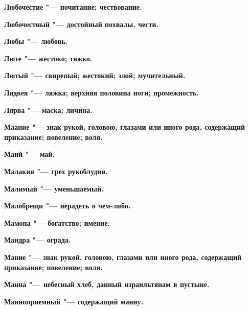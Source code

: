 \bfseries Любочестие \normalfont{} "--- почитание; чествование. 




\bfseries Любочестный \normalfont{} "--- достойный похвалы, чести. 




\bfseries Любы \normalfont{} "--- любовь. 




\bfseries Люте \normalfont{} "--- жестоко; тяжко. 




\bfseries Лютый \normalfont{} "--- свирепый; жестокий; злой; мучительный. 




\bfseries Лядвея \normalfont{} "--- ляжка; верхняя половина ноги; промежность. 




\bfseries Лярва \normalfont{} "--- маска; личина. 




 





\bfseries Маание \normalfont{} "--- знак рукой, головою, глазами или иного рода, содержащий приказание; повеление; воля. 




\bfseries Маий \normalfont{} "--- май. 




\bfseries Малакия \normalfont{} "--- грех рукоблудия. 




\bfseries Малимый \normalfont{} "--- уменьшаемый. 




\bfseries Малобрещи \normalfont{} "--- нерадеть о чем-либо. 




\bfseries Мамона \normalfont{} "--- богатство; имение. 




\bfseries Мандра \normalfont{} "--- ограда. 




\bfseries Мание \normalfont{} "--- знак рукой, головою, глазами или иного рода, содержащий приказание; повеление; воля. 




\bfseries Манна \normalfont{} "--- небесный хлеб, данный израильтянам в пустыне. 




\bfseries Манноприемный \normalfont{} "--- содержащий манну. 




